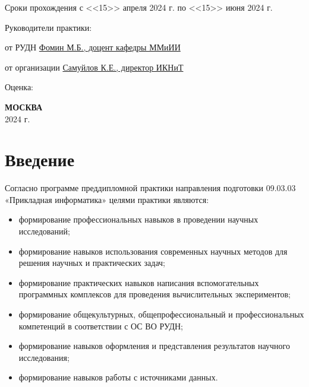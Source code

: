 \documentclass{article}
\begin{document}
\begin{titlepage}
    Сроки прохождения с <<15>> апреля 2024 г. по <<15>> июня 2024 г.

    \begin{adjustwidth}{0.5\textwidth}{0pt}
    Руководители практики:

    от РУДН \underline{Фомин М.Б., доцент  кафедры ММиИИ}

    от организации \underline{Самуйлов К.Е., директор ИКНиТ}
     
     \end{adjustwidth}
    
    Оценка: \underline{\phantom{1234567890 баллов}}
    
     
    \begin{center} \textbf{МОСКВА} \\ 2024 г. \end{center}
    \thispagestyle{empty} %
     
    \end{titlepage}
    
    \newpage


\section{Введение}

Согласно программе преддипломной практики направления подготовки 09.03.03 «Прикладная информатика» целями практики являются:
\begin{itemize}
\item формирование профессиональных навыков в проведении научных исследований;
\item формирование навыков использования современных научных методов для решения научных и практических задач;
\item формирование практических навыков написания вспомогательных программных комплексов для проведения вычислительных экспериментов;
\item формирование общекультурных, общепрофессиональный и профессиональных компетенций в соответствии с ОС ВО РУДН;
\item формирование навыков оформления и представления результатов научного исследования;
\item формирование навыков работы с источниками данных.
\end{itemize}
\end{document}
